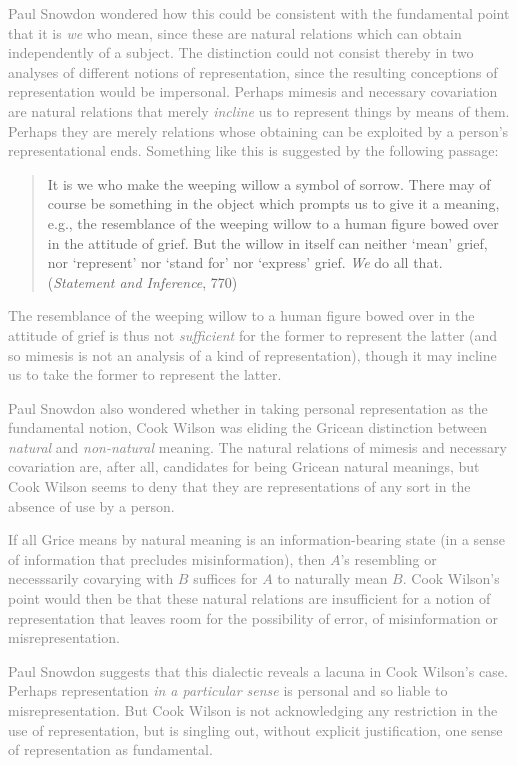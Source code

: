 \documentclass[11pt]{article}
\newcommand{\discuss}[2][gray]{\textcolor{#1}{#2}}
\begin{document}
\discuss{Paul Snowdon wondered how this could be consistent with the fundamental point that it is \emph{we} who mean, since these are natural relations which can obtain independently of a subject. The distinction could not consist thereby in two analyses of different notions of representation, since the resulting conceptions of representation would be impersonal. Perhaps mimesis and necessary covariation are natural relations that merely \emph{incline} us to represent things by means of them. Perhaps they are merely relations whose obtaining can be exploited by a person's representational ends. Something like this is suggested by the following passage:
\begin{quote}
	It is we who make the weeping willow a symbol of sorrow. There may of course be something in the object which prompts us to give it a meaning, e.g., the resemblance of the weeping willow to a human figure bowed over in the attitude of grief. But the willow in itself can neither `mean' grief, nor `represent' nor `stand for' nor `express' grief. \emph{We} do all that. (\emph{Statement and Inference}, 770)
\end{quote}
The resemblance of the weeping willow to a human figure bowed over in the attitude of grief is thus not \emph{sufficient} for the former to represent the latter (and so mimesis is not an analysis of a kind of representation), though it may incline us to take the former to represent the latter.}

\discuss{Paul Snowdon also wondered whether in taking personal representation as the fundamental notion, Cook Wilson was eliding the Gricean distinction between \emph{natural} and \emph{non-natural} meaning. The natural relations of mimesis and necessary covariation are, after all, candidates for being Gricean natural meanings, but Cook Wilson seems to deny that they are representations of any sort in the absence of use by a person.}

\discuss{If all Grice means by natural meaning is an information-bearing state (in a sense of information that precludes misinformation), then \( A \)'s resembling or necesssarily covarying with \( B \) suffices for \( A \) to naturally mean \( B \). Cook Wilson's point would then be that these natural relations are insufficient for a notion of representation that leaves room for the possibility of error, of misinformation or misrepresentation.}

\discuss{Paul Snowdon suggests that this dialectic reveals a lacuna in Cook Wilson's case. Perhaps representation \emph{in a particular sense} is personal and so liable to misrepresentation. But Cook Wilson is not acknowledging any restriction in the use of representation, but is singling out, without explicit justification, one sense of representation as fundamental.}
\end{document}
